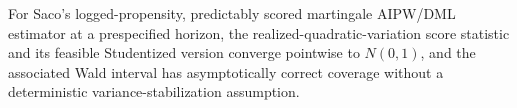 For Saco's logged-propensity, predictably scored martingale AIPW/DML estimator at a prespecified horizon, the realized-quadratic-variation score statistic and its feasible Studentized version converge pointwise to \(N(0,1)\), and the associated Wald interval has asymptotically correct coverage without a deterministic variance-stabilization assumption.